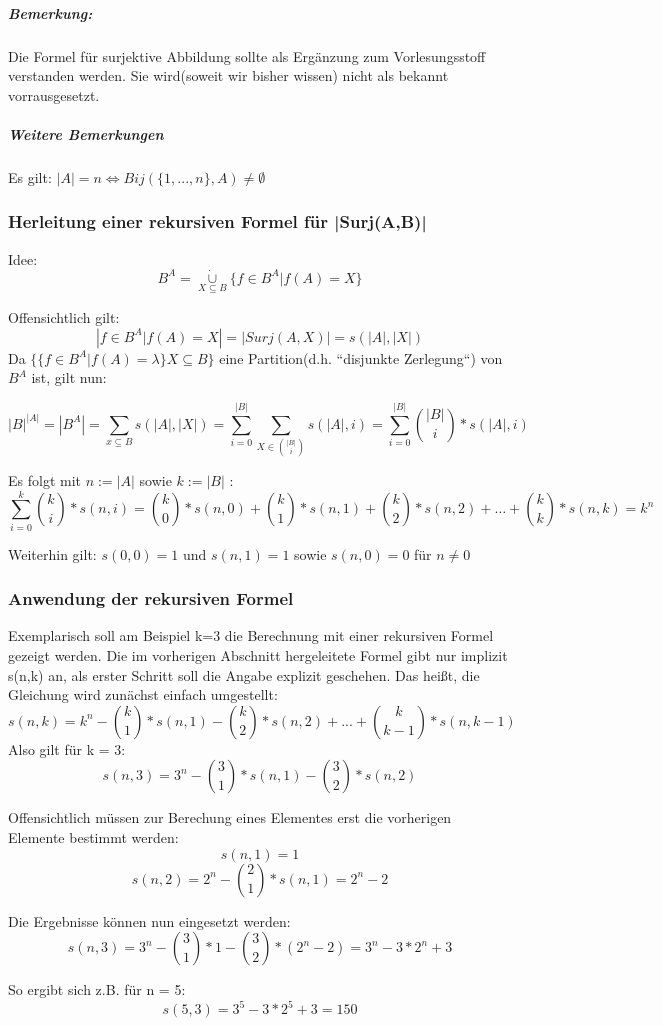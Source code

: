 \subparagraph*{Bemerkung:} Die Formel für surjektive Abbildung sollte als Ergänzung zum Vorlesungsstoff verstanden werden.
Sie wird(soweit wir bisher wissen) nicht als bekannt vorrausgesetzt.

\subparagraph{Weitere Bemerkungen}
Es gilt:
$ |A| = n \Longleftrightarrow Bij( \{1, ... , n\},A) \neq \emptyset$

\subsubsection{Herleitung einer rekursiven Formel für |Surj(A,B)| }
Idee: $$ B^A =  \underset {{X}\subseteq{B}} {\mathbin{\dot{\cup}}} {\{ f\in B^A | f(A) = X \}} $$

Offensichtlich gilt: $$ | {f \in B^A | f(A) = X} | = |Surj(A,X)| = s(|A|, |X|) $$
Da $ \{ \{f \in B^A | f(A) = \lambda \} X \subseteq B \} $ eine Partition(d.h. ``disjunkte Zerlegung``) von $B^A$ ist, gilt nun:

$$ {|B|}^{|A|} = |{B}^{A}| = \sum_{x \subseteq B} s(|A|,|X|)
= \sum_{i = 0}^{|B|} \sum_{X \in  {{|B|}\choose{i}} } s(|A|,i) =
\sum_{i = 0}^{|B|}   {{|B|}\choose{i}} *  s(|A|,i)
$$

Es folgt mit $n:=|A|$ sowie $k:=|B|$ :
$$ \sum_{i = 0}^{k}   {{k}\choose{i}} *  s(n,i)  =
{{k}\choose{0}} * s(n,0) + {{k}\choose{1}} * s(n,1) + {{k}\choose{2}} * s(n,2) + \dots + {{k}\choose{k}} * s(n,k) = k^n $$

Weiterhin gilt: $ s(0,0) = 1 $ und $s(n,1)=1$ sowie $ s(n,0)=0 $ für $ {n}\neq{0} $

\subsubsection{Anwendung der rekursiven Formel}
Exemplarisch soll am Beispiel k=3 die Berechnung mit einer rekursiven Formel gezeigt werden.
Die im vorherigen Abschnitt hergeleitete Formel gibt nur implizit s(n,k) an, als erster Schritt soll die Angabe explizit geschehen.
Das heißt, die Gleichung wird zunächst einfach umgestellt:
$$ s(n,k) = k^n - {{k}\choose{1}} * s(n,1) - {{k}\choose{2}} * s(n,2) + ... + {{k}\choose{k-1}} * s(n,k-1) $$
Also gilt für k = 3:
$$ s(n,3) = 3^n - {{3}\choose{1}} * s(n,1) - {{3}\choose{2}} * s(n,2) $$

Offensichtlich müssen zur Berechung eines Elementes erst die vorherigen Elemente bestimmt werden:
$$ s(n,1) = 1$$
$$ s(n,2) = 2^n - {{2}\choose{1}} * s(n,1) = 2^n -2 $$

Die Ergebnisse können nun eingesetzt werden:
$$ s(n,3) = 3^n - {{3}\choose{1}} * 1 - {{3}\choose{2}} * (2^n -2) = 3^n - 3 * 2^n + 3 $$

So ergibt sich z.B. für n = 5:
$$ s(5,3) = 3^5 - 3 * 2^5 + 3 = 150 $$